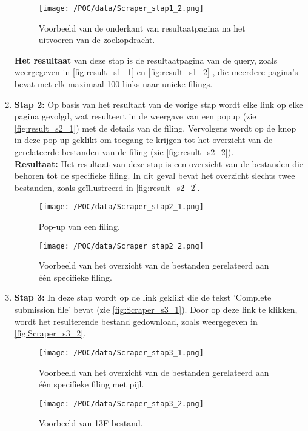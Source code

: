 \begin{enumerate}
    \begin{figure}[H]
        \centering        
        \texttt{[image: /POC/data/Scraper\_stap1\_2.png]}
        \caption{Voorbeeld van de onderkant van resultaatpagina na het uitvoeren van de zoekopdracht.}
        \label{fig:result_s1_2}
    \end{figure}
     \textbf{Het resultaat} van deze stap is de resultaatpagina van de query, zoals weergegeven in \autoref{fig:result_s1_1} en \autoref{fig:result_s1_2} , die meerdere pagina's bevat met elk maximaal 100 links naar unieke filings.\\
    \item \textbf{Stap 2:} Op basis van het resultaat van de vorige stap wordt elke link op elke pagina gevolgd, wat resulteert in de weergave van een popup (zie \autoref{fig:result_s2_1}) met de details van de filing. Vervolgens wordt op de knop in deze pop-up geklikt om toegang te krijgen tot het overzicht van de gerelateerde bestanden van de filing (zie \autoref{fig:result_s2_2}).\\
    \textbf{Resultaat:} Het resultaat van deze stap is een overzicht van de bestanden die behoren tot de specifieke filing. In dit geval bevat het overzicht slechts twee bestanden, zoals geïllustreerd in \autoref{fig:result_s2_2}.

  
    \begin{figure}[H]
        \centering        
        \texttt{[image: /POC/data/Scraper\_stap2\_1.png]}
        \caption{Pop-up van een filing.}
        \label{fig:result_s2_1}
    \end{figure}
    
    \begin{figure}[H]
        \centering        
        \texttt{[image: /POC/data/Scraper\_stap2\_2.png]}
        \caption{Voorbeeld van het overzicht van de bestanden gerelateerd aan één specifieke filing.}
        \label{fig:result_s2_2}
    \end{figure}
    
    \item \textbf{Stap 3:} In deze stap wordt op de link geklikt die de tekst 'Complete submission file' bevat (zie \autoref{fig:Scraper_s3_1}). Door op deze link te klikken, wordt het resulterende bestand gedownload, zoals weergegeven in \autoref{fig:Scraper_s3_2}.
       \begin{figure}[H]
        \centering        
        \texttt{[image: /POC/data/Scraper\_stap3\_1.png]}
        \caption{Voorbeeld van het overzicht van de bestanden gerelateerd aan één specifieke filing met pijl.}
        \label{fig:result_s3_1}
    \end{figure}
    
    \begin{figure}[H]
        \centering        
        \texttt{[image: /POC/data/Scraper\_stap3\_2.png]}
        \caption{Voorbeeld van 13F bestand.}
        \label{fig:result_s3_2}
    \end{figure}
    
\end{enumerate}


